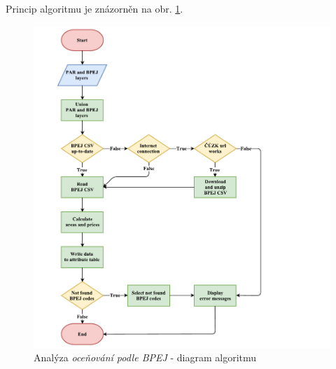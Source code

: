 Princip algoritmu je znázorněn na obr. \ref{fig:diagram_bpej}.

	\begin{figure}[H]
		\includegraphics[width=1.2\textwidth]{./pictures/bpej.pdf}
		\caption[Analýza \textit{oceňování podle BPEJ} - diagram algoritmu]{Analýza \textit{oceňování podle BPEJ} - diagram algoritmu}
		\label{fig:diagram_bpej}
 	\end{figure}

